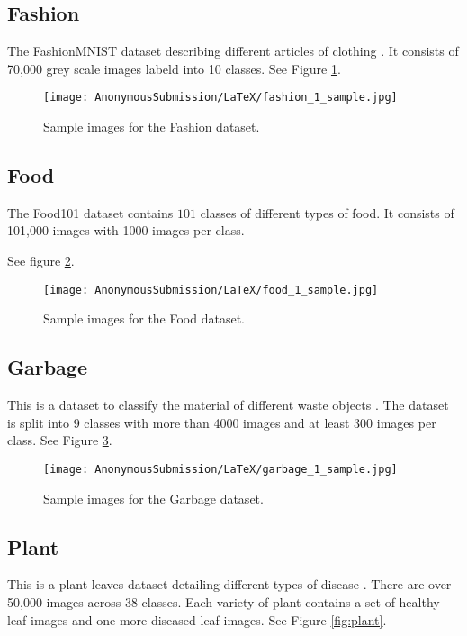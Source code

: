 \documentclass[letterpaper]{article} %
\theoremstyle{plain}
\theoremstyle{definition}
\theoremstyle{remark}
\begin{document}
\subsection{Fashion} The FashionMNIST dataset describing different articles of clothing \citep{fashion}. It consists of 70,000 grey scale images labeld into 10 classes. See Figure \ref{fig:fashion}.


\begin{figure}[htbp]
    \centering
    \texttt{[image: AnonymousSubmission/LaTeX/fashion\_1\_sample.jpg]}
    \caption{Sample images for the Fashion dataset.}
    \label{fig:fashion}
\end{figure}

\subsection{Food} The Food101 dataset \citep{food} contains $101$ classes of different types of food. It consists of 101,000 images with 1000 images per class. 

See figure \ref{fig:food}.

\begin{figure}[htbp]
    \centering
    \texttt{[image: AnonymousSubmission/LaTeX/food\_1\_sample.jpg]}
    \caption{Sample images for the Food dataset.}
    \label{fig:food}
\end{figure}

\subsection{Garbage} This is a dataset to classify the material of different waste objects \citep{single2023realwaste}. The dataset is split into 9 classes with more than 4000 images and at least 300 images per class. See Figure \ref{fig:garbage}.

\begin{figure}[htbp]
    \centering
    \texttt{[image: AnonymousSubmission/LaTeX/garbage\_1\_sample.jpg]}
    \caption{Sample images for the Garbage dataset.}
    \label{fig:garbage}
\end{figure}

\subsection{Plant} This is a plant leaves dataset detailing different types of disease \citep{plant}. There are over 50,000 images across 38 classes. Each variety of plant contains a set of healthy leaf images and one more diseased leaf images. See Figure \ref{fig:plant}.
\end{document}
